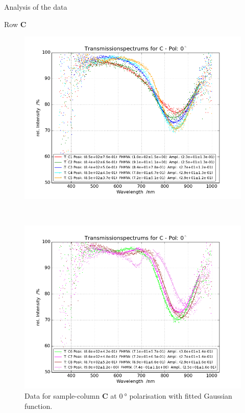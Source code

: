 \documentclass[pdftex, a4paper,11pt, twoside, UKenglish]{report}
\begin{document}
\begin{chapter}{Analysis of the data}
\begin{section}{Row \textbf{C}}
      \newpage
      \begin{figure}[ht!]
        \centering
        \begin{minipage}{.95\textwidth}
          \centering
          \includegraphics[width=\textwidth]
              {Figures/TransspecFIT_CPol0_1to5.png}
          \caption{Data for sample-column \textbf{C} at $\SI{0}{\degree}$
              polarisation with fitted Gaussian function.}
          \label{fig:TransspecFIT_CPol0_1to5}
        \end{minipage}\\
        \begin{minipage}{.95\textwidth}
          \centering
          \includegraphics[width=\textwidth]
              {Figures/TransspecFIT_CPol0_6to9.png}

\end{minipage}
\end{figure}
\end{section}
\end{chapter}
\end{document}
